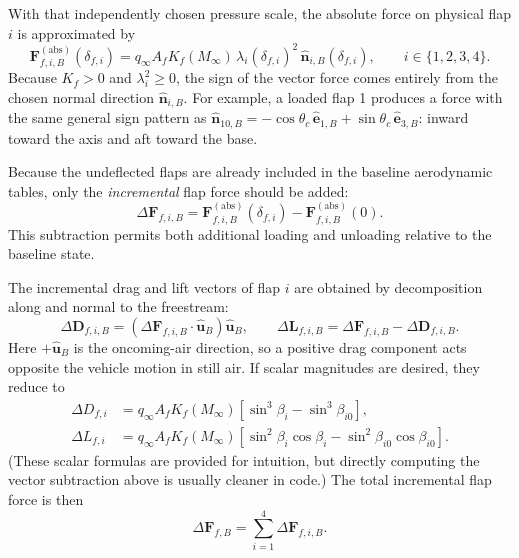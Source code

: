 With that independently chosen pressure scale, the absolute force on physical flap \(i\) is approximated by
\begin{equation}
\mathbf F_{f,i,B}^{(\mathrm{abs})}(\delta_{f,i})
=
q_\infty A_f K_f(M_\infty)\,
\lambda_i(\delta_{f,i})^2\,
\hat{\mathbf n}_{i,B}(\delta_{f,i}),
\qquad
i\in\{1,2,3,4\}. \label{eq:flap_abs_force}
\end{equation}
Because \(K_f>0\) and \(\lambda_i^2\ge 0\), the sign of the vector force comes entirely from the chosen normal direction \(\hat{\mathbf n}_{i,B}\). For example, a loaded flap 1 produces a force with the same general sign pattern as \(\hat{\mathbf n}_{10,B}=-\cos\theta_c\,\hat{\mathbf e}_{1,B}+\sin\theta_c\,\hat{\mathbf e}_{3,B}\): inward toward the axis and aft toward the base.

Because the undeflected flaps are already included in the baseline aerodynamic tables, only the \emph{incremental} flap force should be added:
\begin{equation}
\Delta\mathbf F_{f,i,B}
=
\mathbf F_{f,i,B}^{(\mathrm{abs})}(\delta_{f,i})
-
\mathbf F_{f,i,B}^{(\mathrm{abs})}(0). \label{eq:flap_inc_force}
\end{equation}
This subtraction permits both additional loading and unloading relative to the baseline state.

The incremental drag and lift vectors of flap \(i\) are obtained by decomposition along and normal to the freestream:
\begin{equation}
\Delta\mathbf D_{f,i,B}
=
\left(
\Delta\mathbf F_{f,i,B}\cdot \hat{\mathbf u}_B
\right)\hat{\mathbf u}_B,
\qquad
\Delta\mathbf L_{f,i,B}
=
\Delta\mathbf F_{f,i,B}
-
\Delta\mathbf D_{f,i,B}.
\end{equation}
Here \(+\hat{\mathbf u}_B\) is the oncoming-air direction, so a positive drag component acts opposite the vehicle motion in still air. If scalar magnitudes are desired, they reduce to
\begin{align}
\Delta D_{f,i}
&=
q_\infty A_f K_f(M_\infty)
\left[
\sin^3\beta_i-\sin^3\beta_{i0}
\right], \\
\Delta L_{f,i}
&=
q_\infty A_f K_f(M_\infty)
\left[
\sin^2\beta_i\cos\beta_i
-
\sin^2\beta_{i0}\cos\beta_{i0}
\right].
\end{align}
(These scalar formulas are provided for intuition, but directly computing the vector subtraction above is usually cleaner in code.)
The total incremental flap force is then
\begin{equation}
\Delta\mathbf F_{f,B}
=
\sum_{i=1}^4 \Delta\mathbf F_{f,i,B}. \label{eq:total_flap_force}
\end{equation}

